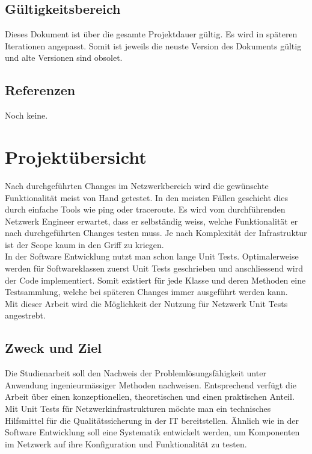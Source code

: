 \documentclass[a4,12pt]{scrartcl}
\begin{document}
\subsection{Gültigkeitsbereich}
Dieses Dokument ist über die gesamte Projektdauer gültig. Es wird in späteren Iterationen angepasst. Somit ist jeweils die neuste Version des Dokuments gültig und alte Versionen sind obsolet.
\subsection{Referenzen}
\begin{description}
Noch keine.
\end{description}

\section{Projektübersicht}
Nach durchgeführten Changes im Netzwerkbereich wird die gewünschte Funktionalität meist von Hand getestet. In den meisten Fällen geschieht dies durch einfache Tools wie ping oder traceroute. Es wird vom durchführenden Netzwerk Engineer erwartet, dass er selbständig weiss, welche Funktionalität er nach durchgeführten Changes testen muss. Je nach Komplexität der Infrastruktur ist der Scope kaum in den Griff zu kriegen. \\

\noindent In der Software Entwicklung nutzt man schon lange Unit Tests. Optimalerweise werden für Softwareklassen zuerst Unit Tests geschrieben und anschliessend wird der Code implementiert. Somit existiert für jede Klasse und deren Methoden eine Testsammlung, welche bei späteren Changes immer ausgeführt werden kann. \\

\noindent Mit dieser Arbeit wird die Möglichkeit der Nutzung für Netzwerk Unit Tests angestrebt.
\subsection{Zweck und Ziel}
Die Studienarbeit soll den Nachweis der Problemlösungsfähigkeit unter Anwendung ingenieurmässiger Methoden nachweisen. Entsprechend verfügt die Arbeit über einen konzeptionellen, theoretischen und einen praktischen Anteil.\\

\noindent Mit Unit Tests für Netzwerkinfrastrukturen möchte man ein technisches Hilfsmittel für die Qualitätssicherung in der IT bereitstellen. Ähnlich wie in der Software Entwicklung soll eine Systematik entwickelt werden, um Komponenten im Netzwerk auf ihre Konfiguration und Funktionalität zu testen. 
\end{document}
